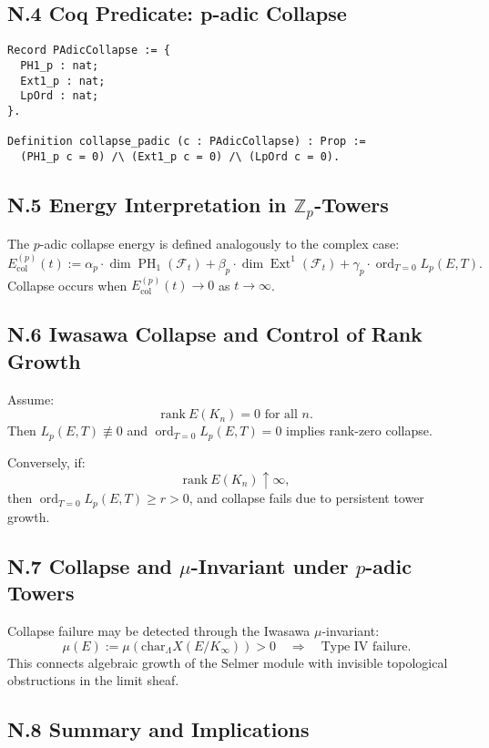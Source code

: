 \documentclass[11pt]{article}
\DeclareMathOperator{\Ext}{Ext}
\DeclareMathOperator{\PH}{PH}
\newcommand{\ord}{\operatorname{ord}}
\begin{document}
\subsection*{N.4 Coq Predicate: p-adic Collapse}
\begin{lstlisting}[language=Coq]
Record PAdicCollapse := {
  PH1_p : nat;
  Ext1_p : nat;
  LpOrd : nat;
}.

Definition collapse_padic (c : PAdicCollapse) : Prop :=
  (PH1_p c = 0) /\ (Ext1_p c = 0) /\ (LpOrd c = 0).
\end{lstlisting}

\subsection*{N.5 Energy Interpretation in \( \mathbb{Z}_p \)-Towers}

The \( p \)-adic collapse energy is defined analogously to the complex case:
\[
E_{\mathrm{col}}^{(p)}(t) := \alpha_p \cdot \dim \PH_1(\mathcal{F}_t) + \beta_p \cdot \dim \Ext^1(\mathcal{F}_t) + \gamma_p \cdot \ord_{T=0} L_p(E, T).
\]
Collapse occurs when \( E_{\mathrm{col}}^{(p)}(t) \to 0 \) as \( t \to \infty \).

\subsection*{N.6 Iwasawa Collapse and Control of Rank Growth}

Assume:
\[
\mathrm{rank}~E(K_n) = 0 \text{ for all } n.
\]
Then \( L_p(E, T) \not\equiv 0 \) and \(\ord_{T=0} L_p(E, T) = 0\) implies rank-zero collapse.

Conversely, if:
\[
\mathrm{rank}~E(K_n) \uparrow \infty,
\]
then \(\ord_{T=0} L_p(E, T) \geq r > 0\), and collapse fails due to persistent tower growth.

\subsection*{N.7 Collapse and \(\mu\)-Invariant under \( p \)-adic Towers}

Collapse failure may be detected through the Iwasawa \( \mu \)-invariant:
\[
\mu(E) := \mu(\mathrm{char}_\Lambda X(E/K_\infty)) > 0 \quad \Rightarrow \quad \text{Type IV failure}.
\]
This connects algebraic growth of the Selmer module with invisible topological obstructions in the limit sheaf.

\subsection*{N.8 Summary and Implications}
\end{document}
